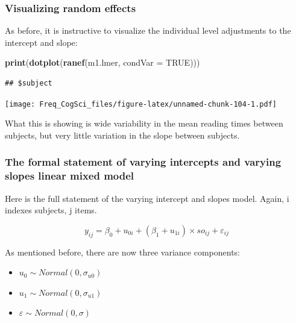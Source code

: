 \documentclass[12pt,]{krantz}
\newenvironment{Shaded}{\begin{snugshade}}{\end{snugshade}}
\newcommand{\DataTypeTok}[1]{\textcolor[rgb]{0.13,0.29,0.53}{#1}}
\newcommand{\KeywordTok}[1]{\textcolor[rgb]{0.13,0.29,0.53}{\textbf{#1}}}
\newcommand{\NormalTok}[1]{#1}
\newcommand{\OtherTok}[1]{\textcolor[rgb]{0.56,0.35,0.01}{#1}}
\providecommand{\tightlist}{%
  \setlength{\itemsep}{0pt}\setlength{\parskip}{0pt}}
\begin{document}
\hypertarget{visualizing-random-effects}{%
\subsubsection{Visualizing random effects}\label{visualizing-random-effects}}

As before, it is instructive to visualize the individual level adjustments to the intercept and slope:

\begin{Shaded}
\begin{Highlighting}[]
\KeywordTok{print}\NormalTok{(}\KeywordTok{dotplot}\NormalTok{(}\KeywordTok{ranef}\NormalTok{(m1.lmer, }\DataTypeTok{condVar =} \OtherTok{TRUE}\NormalTok{)))}
\end{Highlighting}
\end{Shaded}

\begin{verbatim}
## $subject
\end{verbatim}

\texttt{[image: Freq\_CogSci\_files/figure-latex/unnamed-chunk-104-1.pdf]}

What this is showing is wide variability in the mean reading times between subjects, but very little variation in the slope between subjects.

\hypertarget{the-formal-statement-of-varying-intercepts-and-varying-slopes-linear-mixed-model}{%
\subsubsection{The formal statement of varying intercepts and varying slopes linear mixed model}\label{the-formal-statement-of-varying-intercepts-and-varying-slopes-linear-mixed-model}}

Here is the full statement of the varying intercept and slopes model. Again, i indexes subjects, j items.

\begin{equation}
y_{ij} = \beta_0 + u_{0i}+(\beta_1+u_{1i})\times so_{ij} + \varepsilon_{ij}
\end{equation}

As mentioned before, there are now three variance components:

\begin{itemize}
\tightlist
\item
  \(u_0 \sim Normal(0,\sigma_{u0})\)
\item
  \(u_1 \sim Normal(0,\sigma_{u1})\)
\item
  \(\varepsilon \sim Normal(0,\sigma)\)
\end{itemize}
\end{document}

